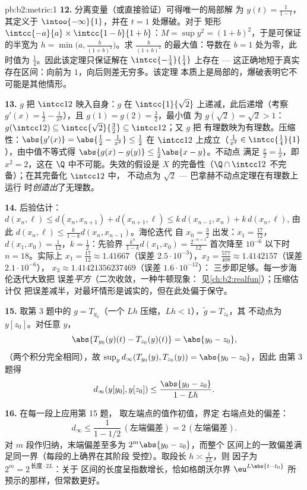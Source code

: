 \begin{solution}{pb:b2:metric:1}
\textbf{12.} 分离变量（或直接验证）可得唯一的局部解
为 $y(t) = \frac1{1 - t}$，其定义于
$\intoo{-\infty}{1}$，并在 $t = 1$ 处爆破。对于
矩形 $\intcc{-a}{a} \times \intcc{1 - b}{1 + b}$：$M =
\sup y^2 = (1 + b)^2$，于是可保证的半宽为 $h =
\min\bigl(a, \frac{b}{(1+b)^2}\bigr)$。求
$\frac{b}{(1+b)^2}$ 的最大值：导数在 $b = 1$ 处为零，此时值为
$\frac14$。因此该定理只保证解在
$\intcc{-\frac14}{\frac14}$ 上存在 --- 这正确地短于真实
存在区间：向前为 $1$，向后则差无穷多。该定理
本质上是局部的，爆破表明它不可能是其他情形。

\textbf{13.} $g$ 把 $\intcc12$ 映入自身：$g$ 在
$\intcc{1}{\sqrt2}$ 上递减，此后递增（考察 $g'(x) = \frac12
- \frac1{x^2}$），且 $g(1) = g(2) = \frac32$，最小值
为 $g(\sqrt2) = \sqrt2 > 1$：$g(\intcc12) \subseteq
\intcc{\sqrt2}{\frac32} \subseteq \intcc12$；又 $g$ 把
有理数映为有理数。压缩性：$\abs{g'(x)} = \abs{\frac12
- \frac1{x^2}} \leq \frac12$ 在 $\intcc12$ 上成立（$\frac1{x^2} \in
\intcc{\frac14}{1}$），由中值不等式得
$\abs{g(x) - g(y)} \leq \frac12\abs{x - y}$。不动点
满足 $\frac x2 = \frac1x$，即 $x^2 = 2$，这在
$\Q$ 中不可能。失效的假设是 $X$ 的完备性（$\Q \cap
\intcc12$ 不完备）；在其完备化 $\intcc12$ 中，
不动点为 $\sqrt2$ --- 巴拿赫不动点定理在有理数上运行
时\emph{创造出}了无理数。

\textbf{14.} 后验估计：$d(x_n, \ell) \leq d(x_n, x_{n+1}) +
d(x_{n+1}, \ell) \leq k\,d(x_{n-1}, x_n) + k\,d(x_n, \ell)$,
由此 $d(x_n, \ell) \leq \frac{k}{1-k}d(x_n, x_{n-1})$。海伦迭代
自 $x_0 = \frac32$ 出发：$x_1 = \frac{17}{12}$，$d(x_1, x_0) =
\frac1{12}$，$k = \frac12$：先验界
$\frac{k^n}{1-k}d(x_1,x_0) = \frac{2^{-n+1}}{12}$ 首次降至
$10^{-6}$ 以下时 $n = 18$。实际上 $x_1 = \frac{17}{12}
\approx 1.41667$（误差 $2.5\cdot10^{-3}$），$x_2 =
\frac{577}{408} \approx 1.4142157$（误差 $2.1\cdot10^{-6}$），
$x_3 \approx 1.41421356237469$（误差 $1.6\cdot10^{-12}$）：
三步即足够。每一步海伦迭代大致把
误差\emph{平方}（二次收敛，一种牛顿现象：
见\cref{ch:b2:realfun}）；压缩估计仅
把误差减半，对最坏情形是诚实的，但在此处偏于保守。

\textbf{15.} 取第 3 题中的 $g = T_{y_0}$（一个
$Lh$ 压缩，$Lh < 1$），$\widetilde g = T_{z_0}$，其
不动点为 $y[z_0]$。对任意 $y$，
\[
\abs{T_{y_0}(y)(t) - T_{z_0}(y)(t)} = \abs{y_0 - z_0},
\]
（两个积分完全相同），故 $\sup_y
d_\infty(T_{y_0}(y), T_{z_0}(y)) = \abs{y_0 - z_0}$，因此
由第 3 题得
\[
d_\infty(y[y_0], y[z_0]) \leq \frac{\abs{y_0 - z_0}}{1 - Lh} .
\]

\textbf{16.} 在每一段上应用第 15 题，
取左端点的值作初值，界定
右端点处的偏差：
\[
d_\infty \leq \frac{1}{1 - 1/2}\,(\text{左端偏差})
= 2\,(\text{左端偏差}) .
\] 对
$m$ 段作归纳，末端偏差至多为
$2^m\abs{y_0 - z_0}$，而整个
区间上的一致偏差满足同一界（每段的上确界在其阶段
受控）。取段长 $h \asymp \frac1{2L}$，则
因子为 $2^m = 2^{\,\text{长度}\cdot 2L}$：关于
区间的长度呈指数增长，恰如格朗沃尔界
$\eu^{L\abs{t-t_0}}$ 所预示的那样，但常数更好。


\end{solution}
